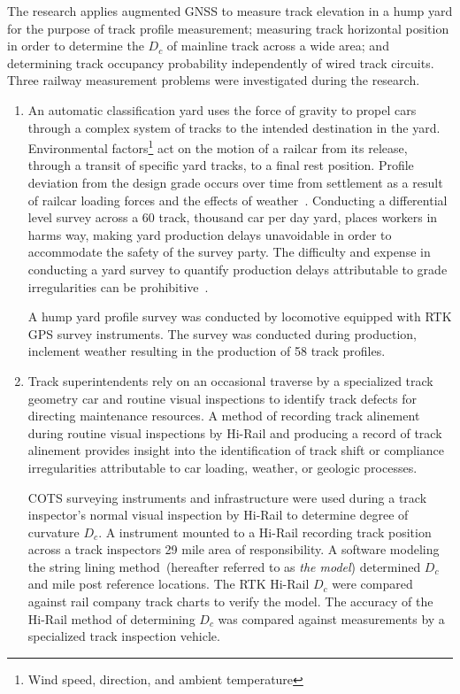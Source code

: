 The research applies augmented GNSS to measure track elevation in a hump yard for the purpose of track profile measurement; measuring track horizontal position in order to determine the $D_c$ of mainline track across a wide area; and determining track occupancy probability independently of wired track circuits. Three railway measurement problems were investigated during the research.
\begin{enumerate}
\firmlist
	\item An automatic classification yard uses the force of gravity to propel cars through a complex system of tracks to the intended destination in the yard. Environmental factors\footnote{Wind speed, direction, and ambient temperature} act on the motion of a railcar from its release, through a transit of specific yard tracks, to a final rest position. Profile deviation from the design grade occurs over time from settlement as a result of railcar loading forces and the effects of weather~\citep{2005szwilski}. Conducting a differential level survey across a 60 track, thousand car per day yard, places workers in harms way, making yard production delays unavoidable in order to accommodate the safety of the survey party. The difficulty and expense in conducting a yard survey to quantify production delays attributable to grade irregularities can be prohibitive~\citep{2007barnes}. 
	
A hump yard profile survey was conducted by locomotive equipped with RTK GPS survey instruments. The survey was conducted during production, inclement weather resulting in the production of 58 track profiles.
	
	\item Track superintendents rely on an occasional traverse by a specialized track geometry car and routine visual inspections to identify track defects for directing maintenance resources. A method of recording track alinement during routine visual inspections by Hi-Rail and producing a record of track alinement provides insight into the identification of track shift or compliance irregularities attributable to car loading, weather, or geologic processes.
	
COTS surveying instruments and infrastructure were used during a track inspector's normal visual inspection by Hi-Rail to determine degree of curvature ${D_c}$. A instrument mounted to a Hi-Rail recording track position across a track inspectors 29 mile area of responsibility. A software modeling the string lining method~\citep{49CFR213D,2007FRATrack,2009bright}(hereafter referred to as \emph{the model}) determined ${D_c}$ and mile post reference locations. The RTK Hi-Rail $D_c$ were compared against rail company track charts to verify the model. The accuracy of the Hi-Rail method of determining $D_c$ was compared against measurements by a specialized track inspection vehicle.
	

\end{enumerate}
